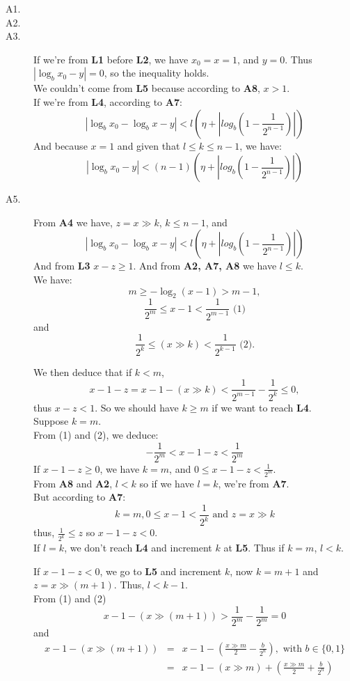 \documentclass[a4paper,12pt]{article}
\begin{document}
\begin{description}
\item[A1.]
\item[A2.]
\item[A3.]
If we're from \textbf{L1} before \textbf{L2}, we have $x_0 = x = 1$, and $y=0$.
Thus $|\log_bx_0 - y| = 0$, so the inequality holds.\\
We couldn't come from \textbf{L5} because according to \textbf{A8}, $x > 1$.\\
If we're from \textbf{L4}, according to \textbf{A7}:
\[ |\log_bx_0 - \log_b x - y| < l \left(\eta +
\left|log_b\left(1 - \frac{1}{2^{n-1}}\right)\right|\right)\]
And because $x = 1$ and given that $l \le k \le n-1$, we have:
\[ |\log_bx_0 - y| < (n-1) \left(\eta +
\left|log_b\left(1 - \frac{1}{2^{n-1}}\right)\right|\right)\]
\item[A5.]
From \textbf{A4} we have, $z = x \gg k$, $k \le n-1$, and
\[ |\log_bx_0 - \log_bx - y| < l \left(\eta +
\left|log_b\left(1 - \frac{1}{2^{n-1}}\right) \right| \right)\]
And from \textbf{L3} $x - z \ge 1$.  And from \textbf{A2, A7, A8} we have
$l \le k$.\\
We have:
\[ m \ge -\log_2(x-1) > m-1, \]
\[ \frac{1}{2^m} \le x-1 < \frac{1}{2^{m-1}} \mbox{ (1)}\]and
\[ \frac{1}{2^k} \le (x \gg k) < \frac{1}{2^{k-1}}\mbox{ (2)}.\]

We then deduce that if $k < m$, \[
x-1-z = x-1-(x \gg k) < \frac{1}{2^{m-1}} - \frac{1}{2^k} \le 0,\]
thus $x-z < 1$. So we should have $k \ge m$ if we want to reach \textbf{L4}.\\
Suppose $k = m$.\\
From (1) and (2), we deduce:
\[ -\frac{1}{2^m} < x - 1 - z < \frac{1}{2^m} \]
If $x-1-z \ge 0$, we have $k=m$, and $0 \le x-1-z < \frac{1}{2^m}$.\\
From \textbf{A8} and \textbf{A2}, $l < k$ so if we have $l = k$, we're from
\textbf{A7}.\\
But according to \textbf{A7}:
\[ k = m, 0 \le x-1 < \frac{1}{2^k} \mbox{ and } z = x \gg k\]
thus, $\frac{1}{2^k} \le z$ so $x-1-z < 0$.\\
If $l = k$, we don't reach \textbf{L4} and increment $k$ at \textbf{L5}.  Thus
if $k = m$, $l < k$.

If $x-1-z < 0$, we go to \textbf{L5} and increment $k$, now $k = m+1$ and
$z = x \gg (m+1)$.  Thus, $l < k-1$.\\
From (1) and (2)
\[ x-1-(x \gg (m+1)) > \frac{1}{2^m} - \frac{1}{2^m} = 0 \] and
\begin{eqnarray*}
x-1-(x\gg(m+1)) &=& x-1 - \left(\frac{x \gg m}{2} - \frac{b}{2^n} \right),
\mbox{ with } b \in \{0, 1\}\\ &=&
x-1 - (x \gg m) + \left(\frac{x \gg m}{2} + \frac{b}{2^n}\right)
\end{eqnarray*}


\end{description}
\end{document}
